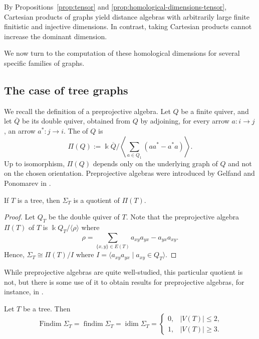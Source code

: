 \documentclass[a4paper,leqno]{amsart}
\begin{document}
\begin{rmk}
    By Propositions~\ref{prop:tensor} and \ref{prop:homological-dimensions-tensor}, Cartesian products of graphs yield distance algebras with arbitrarily large finite finitistic and injective dimensions. In contrast, taking Cartesian products cannot increase the dominant dimension.
\end{rmk}

We now turn to the computation of these homological dimensions for several specific families of graphs.


\subsection{The case of tree graphs}\label{subsec:tree}

We recall the definition of a preprojective algebra. Let $Q$ be a
finite quiver, and let $\overline Q$ be its double quiver, obtained
from $Q$ by adjoining, for every arrow $a:i\to j$, an arrow
$a^*:j\to i$. The  of $Q$ is
$$\Pi(Q):=\Bbbk\overline Q\bigg/\left\langle\sum_{a\in Q_1}(aa^*-a^*a)
\right\rangle.$$
Up to isomorphism, $\Pi(Q)$ depends only on the underlying graph of
$Q$ and not on the chosen orientation. Preprojective algebras were
introduced by Gelfand and Ponomarev in \cite{GP79}.

\begin{prop}
If $T$ is a tree, then $\Sigma_T$ is a quotient of $\Pi(T)$.
\end{prop}

\begin{proof}
Let $Q_T$ be the double quiver of $T$. Note that the preprojective algebra $\Pi(T)$ of $T$ is $\Bbbk Q_T/\langle \rho\rangle$ where
$$\rho=\sum_{\{x,y\}\in E(T)}a_{xy}a_{yx}-a_{yx}a_{xy}.$$
Hence, $\Sigma_T \cong \Pi(T)/I$ where $I=\langle a_{xy}a_{yx}\mid a_{xy}\in Q_T\rangle$.
\end{proof}

While preprojective algebras are quite well-studied, this particular quotient is not, but there is some use of it to obtain results for preprojective algebras, for instance, in \cite{Miz14}.

\begin{prop}\label{prop:idim Sigma tree}
Let $T$ be a tree. Then
$$
\operatorname{Findim} \Sigma_T=\operatorname{findim} \Sigma_T=\operatorname{idim}\Sigma_T=
\begin{cases}
0, & |V(T)|\leq 2,\\
1, & |V(T)|\geq 3.
\end{cases}
$$
\end{prop}
\end{document}
